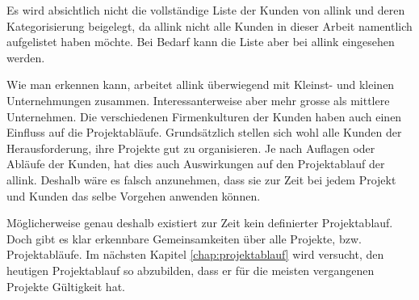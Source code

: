 Es wird absichtlich nicht die vollständige Liste der Kunden von allink und deren 
Kategorisierung beigelegt, da allink nicht alle Kunden in dieser Arbeit namentlich 
aufgelistet haben möchte. Bei Bedarf kann die Liste aber bei allink eingesehen werden.

Wie man erkennen kann, arbeitet allink überwiegend mit Kleinst- und kleinen 
Unternehmungen zusammen. Interessanterweise aber mehr grosse als mittlere
Unternehmen. Die verschiedenen Firmenkulturen der Kunden haben auch einen 
Einfluss auf die Projektabläufe. Grundsätzlich stellen sich wohl alle Kunden
der Herausforderung, ihre Projekte gut zu organisieren. Je nach Auflagen oder
Abläufe der Kunden, hat dies auch Auswirkungen auf den Projektablauf der allink.
Deshalb wäre es falsch anzunehmen, dass sie zur Zeit bei jedem Projekt und 
Kunden das selbe Vorgehen anwenden können.

Möglicherweise genau deshalb existiert zur Zeit kein definierter Projektablauf. 
Doch gibt es klar erkennbare Gemeinsamkeiten über alle Projekte, bzw. Projektabläufe.
Im nächsten Kapitel \ref{chap:projektablauf} wird versucht, den heutigen Projektablauf so 
abzubilden, dass er für die meisten vergangenen Projekte Gültigkeit hat.
